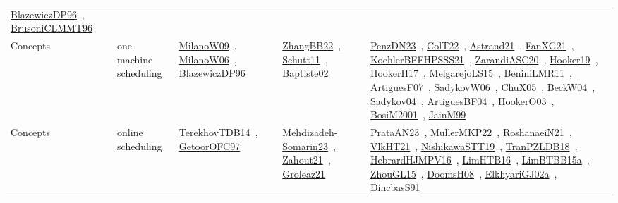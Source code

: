 {\begin{longtable}{lp{3cm}>{\raggedright\arraybackslash}p{6cm}>{\raggedright\arraybackslash}p{6cm}>{\raggedright\arraybackslash}p{8cm}}
\href{../works/BlazewiczDP96.pdf}{BlazewiczDP96}~\cite{BlazewiczDP96}, \href{../works/BrusoniCLMMT96.pdf}{BrusoniCLMMT96}~\cite{BrusoniCLMMT96}\\
\index{one-machine scheduling}\index{Concepts!one-machine scheduling}Concepts & one-machine scheduling & \href{../works/MilanoW09.pdf}{MilanoW09}~\cite{MilanoW09}, \href{../works/MilanoW06.pdf}{MilanoW06}~\cite{MilanoW06}, \href{../works/BlazewiczDP96.pdf}{BlazewiczDP96}~\cite{BlazewiczDP96} & \href{../works/ZhangBB22.pdf}{ZhangBB22}~\cite{ZhangBB22}, \href{../works/Schutt11.pdf}{Schutt11}~\cite{Schutt11}, \href{../works/Baptiste02.pdf}{Baptiste02}~\cite{Baptiste02} & \href{../works/PenzDN23.pdf}{PenzDN23}~\cite{PenzDN23}, \href{../works/ColT22.pdf}{ColT22}~\cite{ColT22}, \href{../works/Astrand21.pdf}{Astrand21}~\cite{Astrand21}, \href{../works/FanXG21.pdf}{FanXG21}~\cite{FanXG21}, \href{../works/KoehlerBFFHPSSS21.pdf}{KoehlerBFFHPSSS21}~\cite{KoehlerBFFHPSSS21}, \href{../works/ZarandiASC20.pdf}{ZarandiASC20}~\cite{ZarandiASC20}, \href{../works/Hooker19.pdf}{Hooker19}~\cite{Hooker19}, \href{../works/HookerH17.pdf}{HookerH17}~\cite{HookerH17}, \href{../works/MelgarejoLS15.pdf}{MelgarejoLS15}~\cite{MelgarejoLS15}, \href{../works/BeniniLMR11.pdf}{BeniniLMR11}~\cite{BeniniLMR11}, \href{../works/ArtiguesF07.pdf}{ArtiguesF07}~\cite{ArtiguesF07}, \href{../works/SadykovW06.pdf}{SadykovW06}~\cite{SadykovW06}, \href{../works/ChuX05.pdf}{ChuX05}~\cite{ChuX05}, \href{../works/BeckW04.pdf}{BeckW04}~\cite{BeckW04}, \href{../works/Sadykov04.pdf}{Sadykov04}~\cite{Sadykov04}, \href{../works/ArtiguesBF04.pdf}{ArtiguesBF04}~\cite{ArtiguesBF04}, \href{../works/HookerO03.pdf}{HookerO03}~\cite{HookerO03}, \href{../works/BosiM2001.pdf}{BosiM2001}~\cite{BosiM2001}, \href{../works/JainM99.pdf}{JainM99}~\cite{JainM99}\\
\index{online scheduling}\index{Concepts!online scheduling}Concepts & online scheduling & \href{../works/TerekhovTDB14.pdf}{TerekhovTDB14}~\cite{TerekhovTDB14}, \href{../works/GetoorOFC97.pdf}{GetoorOFC97}~\cite{GetoorOFC97} & \href{../works/Mehdizadeh-Somarin23.pdf}{Mehdizadeh-Somarin23}~\cite{Mehdizadeh-Somarin23}, \href{../works/Zahout21.pdf}{Zahout21}~\cite{Zahout21}, \href{../works/Groleaz21.pdf}{Groleaz21}~\cite{Groleaz21} & \href{../works/PrataAN23.pdf}{PrataAN23}~\cite{PrataAN23}, \href{../works/MullerMKP22.pdf}{MullerMKP22}~\cite{MullerMKP22}, \href{../works/RoshanaeiN21.pdf}{RoshanaeiN21}~\cite{RoshanaeiN21}, \href{../works/VlkHT21.pdf}{VlkHT21}~\cite{VlkHT21}, \href{../works/NishikawaSTT19.pdf}{NishikawaSTT19}~\cite{NishikawaSTT19}, \href{../works/TranPZLDB18.pdf}{TranPZLDB18}~\cite{TranPZLDB18}, \href{../works/HebrardHJMPV16.pdf}{HebrardHJMPV16}~\cite{HebrardHJMPV16}, \href{../works/LimHTB16.pdf}{LimHTB16}~\cite{LimHTB16}, \href{../works/LimBTBB15a.pdf}{LimBTBB15a}~\cite{LimBTBB15a}, \href{../works/ZhouGL15.pdf}{ZhouGL15}~\cite{ZhouGL15}, \href{../works/DoomsH08.pdf}{DoomsH08}~\cite{DoomsH08}, \href{../works/ElkhyariGJ02a.pdf}{ElkhyariGJ02a}~\cite{ElkhyariGJ02a}, \href{../works/DincbasS91.pdf}{DincbasS91}~\cite{DincbasS91}\\

\end{longtable}}
